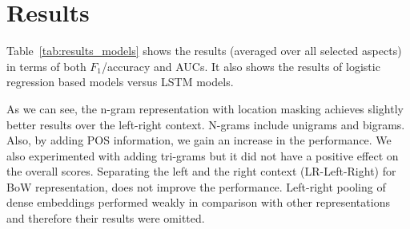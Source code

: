 \documentclass[11pt]{article}
\begin{document}
\section{Results}
    Table~\ref{tab:results_models} shows the results (averaged over all selected aspects) in terms of both $F_1$/accuracy and AUCs. It also shows the results of logistic regression based models versus LSTM models. 
    
    As we can see, the n-gram representation with location masking achieves slightly better results over the left-right context. N-grams include unigrams and bigrams. Also, by adding POS information, we gain an increase in the performance. We also experimented with adding tri-grams but it did not have a positive effect on the overall scores. Separating the left and the right context (LR-Left-Right) for BoW representation, does not improve the performance. Left-right pooling of dense embeddings performed weakly in comparison with other representations and therefore their results were omitted. 
\end{document}
